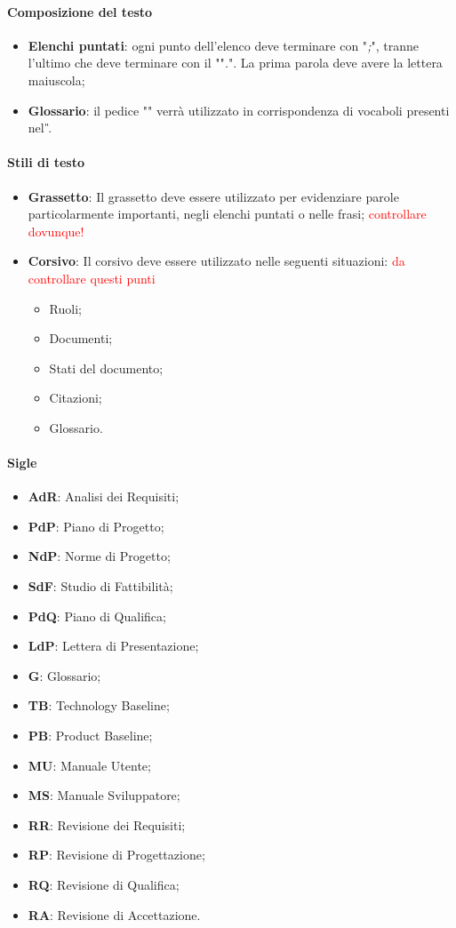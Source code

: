 \paragraph{Composizione del testo}
\begin{itemize}
	\item \textbf{Elenchi puntati}: ogni punto dell'elenco deve terminare con "\emph{;}",
	tranne l'ultimo che deve terminare con il ""\emph{.}". La prima parola deve avere la lettera
	maiuscola;
	\item \textbf{Glossario}: il pedice "" verrà utilizzato in corrispondenza di vocaboli presenti nel \textit{\G}.
\end{itemize}
\paragraph{Stili di testo}
\begin{itemize}
	\item \textbf{Grassetto}: Il grassetto deve essere utilizzato per evidenziare parole
	particolarmente importanti, negli elenchi puntati o nelle frasi; \textcolor{red}{controllare dovunque!}
	\item \textbf{Corsivo}: Il corsivo deve essere utilizzato nelle seguenti
	situazioni: \textcolor{red}{da controllare questi punti}
	\begin{itemize}
		\item Ruoli;
		\item Documenti;
		\item Stati del documento;
		\item Citazioni;
		\item Glossario.
	\end{itemize}
\end{itemize}
\paragraph{Sigle}
\begin{itemize}
	\item \textbf{AdR}: Analisi dei Requisiti;
	\item \textbf{PdP}: Piano di Progetto;
	\item \textbf{NdP}: Norme di Progetto;
	\item \textbf{SdF}: Studio di Fattibilità;
	\item \textbf{PdQ}: Piano di Qualifica;
	\item \textbf{LdP}: Lettera di Presentazione;
	\item \textbf{G}: Glossario;
	\item \textbf{TB}: Technology Baseline;
	\item \textbf{PB}: Product Baseline;
	\item \textbf{MU}: Manuale Utente;
	\item \textbf{MS}: Manuale Sviluppatore;
	\item \textbf{RR}: Revisione dei Requisiti;
	\item \textbf{RP}: Revisione di Progettazione;
	\item \textbf{RQ}: Revisione di Qualifica;
	\item \textbf{RA}: Revisione di Accettazione.
\end{itemize}
